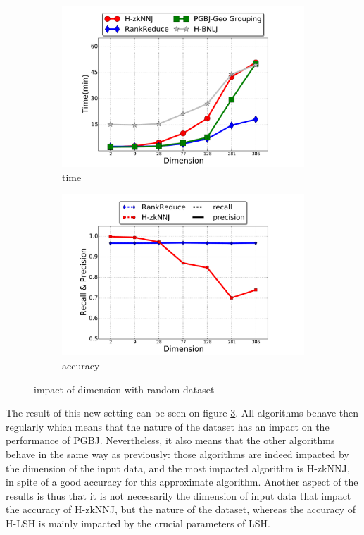 \begin{figure}[!h]
 \centering
 \centering
		\begin{subfigure}[b]{0.25\textwidth}
                 \includegraphics[width=\textwidth]{img-perf/dim/randtime.pdf} 
                \caption{time}
                \label{dim_rand_time}
        \end{subfigure}%
        \begin{subfigure}[b]{0.25\textwidth}
                 \includegraphics[width=\textwidth]{img-perf/dim/randacc.pdf} 
                \caption{accuracy}
                \label{dim_rand_acc}
        \end{subfigure}
         \caption{impact of dimension with random dataset}
          \label{fig:dim_rand}
\end{figure}
The result of this new setting can be seen on figure \ref{fig:dim_rand}.
All algorithms behave then regularly which means that the nature of the dataset has an impact on the performance of PGBJ. Nevertheless, it also means that the other algorithms behave in the same way as previously: those algorithms are indeed impacted by the dimension of the input data, and the most impacted algorithm is H-zkNNJ, in spite of a good accuracy for this approximate algorithm.
Another aspect of the results is thus that it is not necessarily the dimension of input data that impact the accuracy of H-zkNNJ, but the nature of the dataset, whereas the accuracy of H-LSH is mainly impacted by the crucial parameters of LSH.

